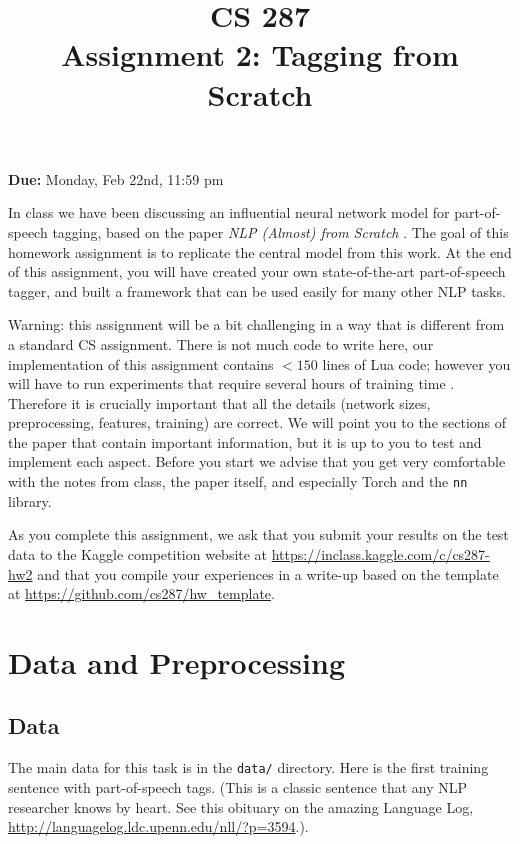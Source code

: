 \documentclass[11pt]{article}
\title{CS 287 \\ Assignment 2: Tagging from Scratch }
\date{}
\begin{document}
\maketitle{}

\begin{center}
  \textbf{Due:} Monday, Feb 22nd, 11:59 pm 
\end{center}


In class we have been discussing an influential neural network model
for part-of-speech tagging, based on the paper \textit{NLP (Almost)
  from Scratch} \citep{collobert2011natural}. The goal of this
homework assignment is to replicate the central model from this
work. At the end of this assignment, you will have created your own
state-of-the-art part-of-speech tagger, and built a framework that can
be used easily for many other NLP tasks.

Warning: this assignment will be a bit challenging in a way that is
different from a standard CS assignment. There is not much code to
write here, our implementation of this assignment contains $<150$
lines of Lua code; however you will have to run experiments that
require several hours of training time . Therefore it is crucially
important that all the details (network sizes, preprocessing,
features, training) are correct.  We will point you to the sections of
the paper that contain important information, but it is up to you to
test and implement each aspect.  Before you start we advise that you
get very comfortable with the notes from class, the paper itself, and especially Torch and the \texttt{nn}
library.


As you complete this assignment, we ask that you submit your results
on the test data to the Kaggle competition website at
\url{https://inclass.kaggle.com/c/cs287-hw2} and that you compile your
experiences in a write-up based on the template at
\url{https://github.com/cs287/hw_template}.

\section{Data and Preprocessing}

\subsection{Data}

The main data for this task is in the \texttt{data/} directory. Here
is the first training sentence with part-of-speech tags. (This is a
classic sentence that any NLP researcher knows by heart. See this obituary on
the amazing Language Log, 
\url{http://languagelog.ldc.upenn.edu/nll/?p=3594}.).
\end{document}
